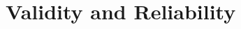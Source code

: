 \documentclass[12pt, a4paper]{article}
\begin{document}

\section{Validity and Reliability}
\label{validity-and-reliability-not-needed-for-the-project-proposal}
\end{document}

